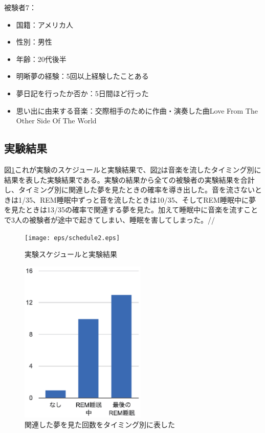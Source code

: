 被験者7：
\begin{itemize}
\item 国籍：アメリカ人
\item 性別：男性
\item 年齢：20代後半
\item 明晰夢の経験：5回以上経験したことある
\item 夢日記を行ったか否か：5日間ほど行った
\item 思い出に由来する音楽：交際相手のために作曲・演奏した曲Love From The Other Side Of The World\end{itemize}

\subsection{実験結果}
図\ref{schedule}これが実験のスケジュールと実験結果で、図\ref{result}は音楽を流したタイミング別に結果を表した実験結果である。実験の結果から全ての被験者の実験結果を合計し、タイミング別に関連した夢を見たときの確率を導き出した。音を流さないときは1/35、REM睡眠中ずっと音を流したときは10/35、そしてREM睡眠中に夢を見たときは13/35の確率で関連する夢を見た。加えて睡眠中に音楽を流すことで3人の被験者が途中で起きてしまい、睡眠を害してしまった。//
\begin{figure}[htbp]
\begin{center}
\texttt{[image: eps/schedule2.eps]}
\caption{実験スケジュールと実験結果}
\label{schedule}
\end{center}
\end{figure}

\begin{figure}[htbp]
\begin{center}
\includegraphics[width=6cm]{eps/result.eps}
\caption{関連した夢を見た回数をタイミング別に表した}
\label{result}
\end{center}
\end{figure}

